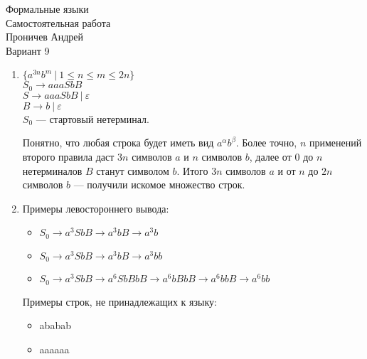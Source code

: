 \documentclass[12pt]{article}
\begin{document}
\begin{center}
{\LARGE Формальные языки}\\

{\Large Самостоятельная работа}\\

{\Large Проничев Андрей}\\

{\Large Вариант 9}
\end{center}

\bigskip

\begin{enumerate}

	\item %
	$ 	\{a^{3n}b^m \ | \ 1 \le n \le m \le 2n\} $\\
	$ S_0 \to aaaSbB $\\
	$ S \to aaaSbB  \ | \ \varepsilon$\\
	$ B \to b \ | \  \varepsilon $\\
	$ S_0 $ --- стартовый нетерминал.
	
	Понятно, что любая строка будет иметь вид $ a^{\alpha}b^{\beta} $. Более точно, $ n $  применений второго правила даст $ 3n $ символов $ a $ и $ n $ символов $ b $, далее от $ 0 $ до $ n $ нетерминалов $ B $  станут символом $ b $. Итого $ 3n $ символов $ a $ и от $ n $ до $ 2n $ символов $ b $ --- получили искомое множество строк.
	
	\item %
	Примеры левостороннего вывода:
	\begin{itemize}
		\item $ S_0 \to a^3SbB \to a^3bB \to a^3b $
		\item $ S_0 \to a^3SbB \to a^3bB \to a^3bb $
		\item $ S_0 \to a^3SbB \to a^6SbBbB \to a^6bBbB \to a^6bbB \to a^6bb $
	\end{itemize}
	Примеры строк, не принадлежащих к языку:
	\begin{itemize}
		\item ababab
		\item aaaaaa
	\end{itemize}
	

\end{enumerate}
\end{document}
